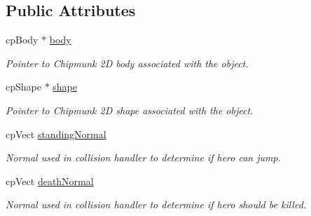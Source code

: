 \subsection*{Public Attributes}
\begin{DoxyCompactItemize}
\item 
cp\+Body $\ast$ \hyperlink{class_physics_object_ae836920d09d47b9b046c69c3fdd8dba1}{body}\hypertarget{class_physics_object_ae836920d09d47b9b046c69c3fdd8dba1}{}\label{class_physics_object_ae836920d09d47b9b046c69c3fdd8dba1}

\begin{DoxyCompactList}\small\item\em Pointer to Chipmunk 2D body associated with the object. \end{DoxyCompactList}\item 
cp\+Shape $\ast$ \hyperlink{class_physics_object_a1c41c18cdfe7fababf08210dd36c4d52}{shape}\hypertarget{class_physics_object_a1c41c18cdfe7fababf08210dd36c4d52}{}\label{class_physics_object_a1c41c18cdfe7fababf08210dd36c4d52}

\begin{DoxyCompactList}\small\item\em Pointer to Chipmunk 2D shape associated with the object. \end{DoxyCompactList}\item 
cp\+Vect \hyperlink{class_physics_object_a732744541b96297fe68bcdd4eb15eadc}{standing\+Normal}\hypertarget{class_physics_object_a732744541b96297fe68bcdd4eb15eadc}{}\label{class_physics_object_a732744541b96297fe68bcdd4eb15eadc}

\begin{DoxyCompactList}\small\item\em Normal used in collision handler to determine if hero can jump. \end{DoxyCompactList}\item 
cp\+Vect \hyperlink{class_physics_object_ad4320fa83060bd24c85e5f7a06d07650}{death\+Normal}\hypertarget{class_physics_object_ad4320fa83060bd24c85e5f7a06d07650}{}\label{class_physics_object_ad4320fa83060bd24c85e5f7a06d07650}

\begin{DoxyCompactList}\small\item\em Normal used in collision handler to determine if hero should be killed. \end{DoxyCompactList}\end{DoxyCompactItemize}
